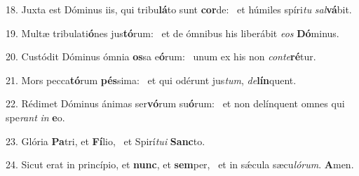 18. Juxta est Dóminus iis, qui tribu\textbf{lá}to sunt \textbf{cor}de: \ast\  et húmiles spíri\textit{tu} \textit{sal}\textbf{vá}bit.\

19. Multæ tribulati\textbf{ó}nes jus\textbf{tó}rum: \ast\  et de ómnibus his liberábit \textit{e}\textit{os} \textbf{Dó}minus.\

20. Custódit Dóminus ómnia \textbf{os}sa e\textbf{ó}rum: \ast\  unum ex his non \textit{con}\textit{te}\textbf{ré}tur.\

21. Mors pecca\textbf{tó}rum \textbf{pés}sima: \ast\  et qui odérunt jus\textit{tum}, \textit{de}\textbf{lín}quent.\

22. Rédimet Dóminus ánimas ser\textbf{vó}rum su\textbf{ó}rum: \ast\  et non delínquent omnes qui spe\textit{rant} \textit{in} \textbf{e}o.\

23. Glória \textbf{Pa}tri, et \textbf{Fí}lio, \ast\  et Spirí\textit{tu}\textit{i} \textbf{Sanc}to.\

24. Sicut erat in princípio, et \textbf{nunc}, et \textbf{sem}per, \ast\  et in sǽcula sæcu\textit{ló}\textit{rum}. \textbf{A}men.\

